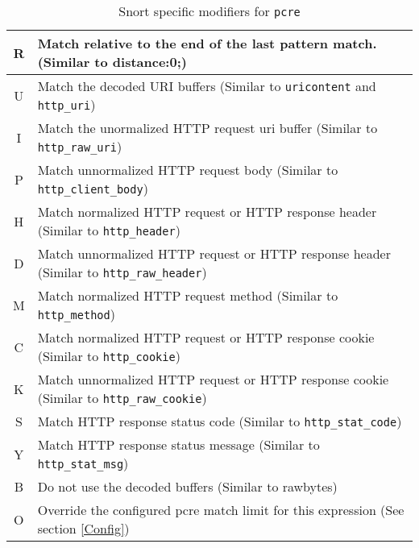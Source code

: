 \documentclass[english]{report}
\begin{document}
\begin{table}[ht]
\begin{center}
\caption{Snort specific modifiers for \texttt{pcre}}
\label{pcre-mod_snort}
\begin{tabular}{|c|p{4.5in}|}

\hline
R &
Match relative to the end of the last pattern match.  (Similar to distance:0;) \\

\hline
U &
Match the decoded URI buffers (Similar to \texttt{uricontent} and \texttt{http\_uri}) \\

\hline
I &
Match the unormalized HTTP request uri buffer (Similar to \texttt{http\_raw\_uri}) \\

\hline
P &
Match unnormalized HTTP request body (Similar to \texttt{http\_client\_body}) \\

\hline
H &
Match normalized HTTP request or HTTP response header (Similar to \texttt{http\_header}) \\

\hline
D &
Match unnormalized HTTP request or HTTP response header (Similar to \texttt{http\_raw\_header}) \\

\hline
M &
Match normalized HTTP request method (Similar to \texttt{http\_method}) \\

\hline
C &
Match normalized HTTP request or HTTP response cookie (Similar to \texttt{http\_cookie}) \\

\hline
K &
Match unnormalized HTTP request or HTTP response cookie (Similar to \texttt{http\_raw\_cookie}) \\

\hline
S &
Match HTTP response status code (Similar to \texttt{http\_stat\_code}) \\

\hline
Y &
Match HTTP response status message (Similar to \texttt{http\_stat\_msg}) \\

\hline
B &
Do not use the decoded buffers (Similar to rawbytes) \\

\hline
O &
Override the configured pcre match limit for this expression (See section \ref{Config}) \\

\hline
\end{tabular}
\end{center}
\end{table}
\end{document}
